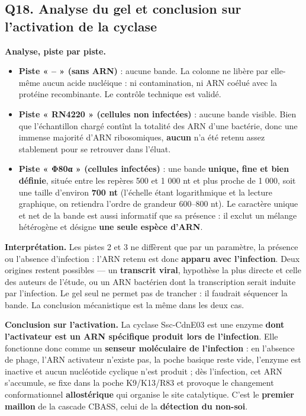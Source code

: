 \documentclass[11pt,a4paper]{article}
\providecommand{\tightlist}{\setlength{\itemsep}{0pt}\setlength{\parskip}{0pt}}
\begin{document}
\hypertarget{q18.-analyse-du-gel-et-conclusion-sur-lactivation-de-la-cyclase}{%
\subsection{Q18. Analyse du gel et conclusion sur l'activation de la cyclase}\label{q18.-analyse-du-gel-et-conclusion-sur-lactivation-de-la-cyclase}}

\textbf{Analyse, piste par piste.}

\begin{itemize}
\tightlist
\item
  \textbf{Piste « -- » (sans ARN)} : aucune bande. La colonne ne libère par elle-même aucun acide nucléique : ni contamination, ni ARN coélué avec la protéine recombinante. Le contrôle technique est validé.
\item
  \textbf{Piste « RN4220 » (cellules non infectées)} : aucune bande visible. Bien que l'échantillon chargé contînt la totalité des ARN d'une bactérie, donc une immense majorité d'ARN ribosomiques, \textbf{aucun} n'a été retenu assez stablement pour se retrouver dans l'éluat.
\item
  \textbf{Piste « Φ80α » (cellules infectées)} : une bande \textbf{unique, fine et bien définie}, située entre les repères 500 et 1 000 nt et plus proche de 1 000, soit une taille d'environ \textbf{700 nt} (l'échelle étant logarithmique et la lecture graphique, on retiendra l'ordre de grandeur 600--800 nt). Le caractère unique et net de la bande est aussi informatif que sa présence : il exclut un mélange hétérogène et désigne \textbf{une seule espèce d'ARN}.
\end{itemize}

\textbf{Interprétation.} Les pistes 2 et 3 ne diffèrent que par un paramètre, la présence ou l'absence d'infection : l'ARN retenu est donc \textbf{apparu avec l'infection}. Deux origines restent possibles --- un \textbf{transcrit viral}, hypothèse la plus directe et celle des auteurs de l'étude, ou un ARN bactérien dont la transcription serait induite par l'infection. Le gel seul ne permet pas de trancher : il faudrait séquencer la bande. La conclusion mécanistique est la même dans les deux cas.

\textbf{Conclusion sur l'activation.} La cyclase Ssc-CdnE03 est une enzyme \textbf{dont l'activateur est un ARN spécifique produit lors de l'infection}. Elle fonctionne donc comme un \textbf{senseur moléculaire de l'infection} : en l'absence de phage, l'ARN activateur n'existe pas, la poche basique reste vide, l'enzyme est inactive et aucun nucléotide cyclique n'est produit ; dès l'infection, cet ARN s'accumule, se fixe dans la poche K9/K13/R83 et provoque le changement conformationnel \textbf{allostérique} qui organise le site catalytique. C'est le \textbf{premier maillon} de la cascade CBASS, celui de la \textbf{détection du non-soi}.
\end{document}
